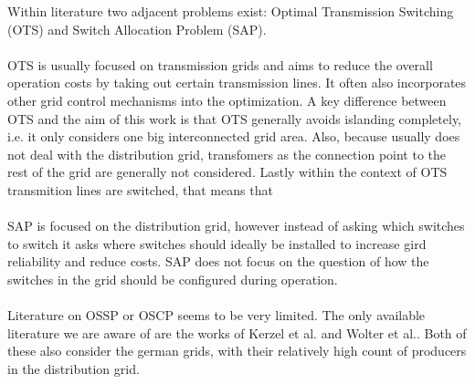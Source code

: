 Within literature two adjacent problems exist: Optimal Transmission Switching (OTS)\autocite{ots_lit_review}
and Switch Allocation Problem (SAP)\autocite{switch_allociation_lit_review}.\\
\\
OTS is usually focused on transmission grids and aims to reduce the overall
operation costs by taking out certain transmission lines. It often also incorporates other grid control
mechanisms into the optimization. A key difference between OTS and the aim of this
work is that OTS generally avoids islanding completely, i.e. it only considers one big interconnected grid 
area. Also, because usually does not deal with the distribution grid, transfomers as the connection point
to the rest of the grid are generally not considered. Lastly within the context of OTS transmition lines are
switched, that means that    \\
\\
SAP is focused on the distribution grid, however instead of asking which switches to switch
it asks where switches should ideally be installed to increase gird reliability and reduce costs.
SAP does not focus on the question of how the switches in the grid should
be configured during operation.\\
\\
Literature on OSSP or OSCP seems to be very limited. The only available
literature we are aware of are the works of
Kerzel et al.\autocite{optimal_switch_configuration} and
Wolter et al.\autocite{meshed_grids}. Both of these also consider the german grids, 
with their relatively high count of producers in the distribution grid. 


